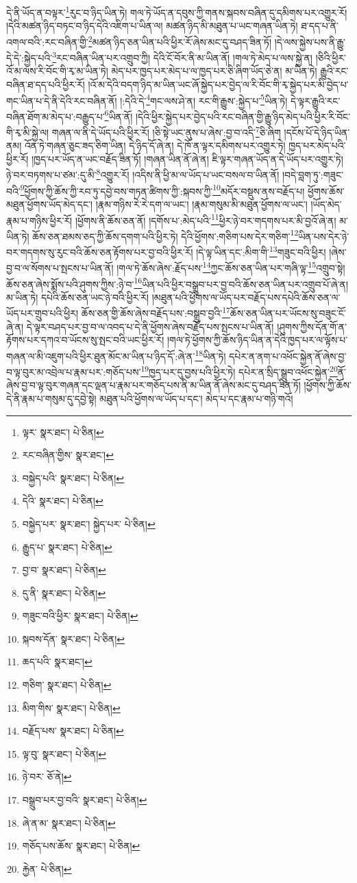 དེ་ནི་ཡོད་ན་བལྟར་\footnote{ལྟར་  སྣར་ཐང་།  པེ་ཅིན། }རུང་བ་ཉིད་ཡིན་ཏེ། གལ་ཏེ་ཡོད་ན་དབུས་ཀྱི་གནས་སྐབས་བཞིན་དུ་དམིགས་པར་འགྱུར་རོ། །དེའི་མཚན་ཉིད་བཏང་བ་ཉིད་དེའི་འཇིག་པ་ཡིན་ལ། མཚན་ཉིད་མི་མཐུན་པ་ཡང་གཞན་ཡིན་ཏེ། ཐ་དད་པ་ནི་འགལ་བའི་:རང་བཞིན་གྱི་\footnote{རང་བཞིན་གྱིས་  སྣར་ཐང་། }མཚན་ཉིད་ཅན་ཡིན་པའི་ཕྱིར་རོ་ཞེས་མང་དུ་བཤད་ཟིན་ཏོ། །དེ་ལས་སྐྱེས་པས་ནི་རྒྱུ་དེ་དེ་:སྐྱེད་པའི་\footnote{བསྐྱེད་པའི་  སྣར་ཐང་།  པེ་ཅིན། }རང་བཞིན་ཡིན་པར་འགྲུབ་ཀྱི། དེའི་ངོ་བོར་ནི་མ་ཡིན་ནོ། །གལ་ཏེ་མེད་པ་ལས་སྐྱེ་ན། །ཅིའི་ཕྱིར་འོ་མ་ལས་རི་བོང་གི་རྭ་མ་ཡིན་ཏེ། མེད་པར་ཁྱད་པར་མེད་པ་ལ་ཁྱད་པར་ཅི་ཞིག་ཡོད་ཅེ་ན། མ་ཡིན་ཏེ། རྒྱུའི་རང་བཞིན་ཐ་དད་པའི་ཕྱིར་རོ། །འོ་མ་དེའི་བདག་ཉིད་མ་ཡིན་ཡང་ཞོ་སྐྱེད་པར་བྱེད་ལ་རི་བོང་གི་རྭ་སྐྱེད་པར་མི་བྱེད་པ་གང་ཡིན་པ་དེ་ནི་དེའི་རང་བཞིན་ནོ། །:དེའི་དེ་\footnote{དེའི་  སྣར་ཐང་།  པེ་ཅིན། }གང་ལས་ཤེ་ན། རང་གི་རྒྱུས་:སྐྱེད་པ་\footnote{བསྐྱེད་པར་  སྣར་ཐང་། སྐྱེད་པར་  པེ་ཅིན། }ཡིན་ཏེ། དེ་ལྟར་རྒྱུའི་རང་བཞིན་ཐོག་མ་མེད་པ་:བརྒྱུད་པ་\footnote{རྒྱུད་པ་  སྣར་ཐང་།  པེ་ཅིན། }ཡིན་ནོ། །དེའི་ཕྱིར་སྐྱེད་པར་བྱེད་པའི་རང་བཞིན་གྱི་རྒྱུ་ཉིད་མེད་པའི་ཕྱིར་རི་བོང་གི་རྭ་མི་སྐྱེ་ལ། གཞན་ལ་ནི་དེ་ཡོད་པའི་ཕྱིར་རོ། །ཅི་སྟེ་ཡང་ནུས་པ་ཞེས་:བྱ་བ་འདི་\footnote{བྱ་བ་  སྣར་ཐང་།  པེ་ཅིན། }ཅི་ཞིག །དངོས་པོ་དེ་ཉིད་ཡིན་ནམ། འོན་ཏེ་གཞན་ཅུང་ཟད་ཅིག་ཡིན། དེ་ཉིད་དོ་ཞེ་ན། དེ་ཁོ་ན་ལྟར་དམིགས་པར་འགྱུར་ཏེ། ཁྱད་པར་མེད་པའི་ཕྱིར་རོ། །ཁྱད་པར་ཡོད་ན་ཡང་བརྗོད་ཟིན་ཏོ། །གཞན་ཡིན་ནོ་ཞེ་ན། ཇི་ལྟར་གཞན་ཡོད་ན་དེ་ཡོད་པར་འགྱུར་ཏེ། ཉེ་བར་བཏགས་པ་ཙམ་:དུ་མི་\footnote{དུ་ནི་  སྣར་ཐང་།  པེ་ཅིན། }འགྱུར་རོ། །འདིས་ནི་ཕྱི་མ་ལ་ཡོད་པ་ཡང་བསལ་བ་ཡིན་ནོ། །བདེ་བླག་ཏུ་:གཟུང་བའི་\footnote{གཟུང་བའི་ཕྱིར་  སྣར་ཐང་།  པེ་ཅིན། }ཕྱོགས་ཀྱི་ཆོས་ཀྱི་རབ་ཏུ་དབྱེ་བས་གཏན་ཚིགས་ཀྱི་:སྐབས་ཀྱི་\footnote{སྐབས་དོན་  སྣར་ཐང་།  པེ་ཅིན། }མདོར་བསྡུས་ནས་བརྗོད་པ། ཕྱོགས་ཆོས་མཐུན་ཕྱོགས་ཡོད་མེད་དང་། །རྣམ་གཉིས་རེ་རེ་དག་ལ་ཡང་། །རྣམ་གསུམ་མི་མཐུན་ཕྱོགས་ལ་ཡང་། །ཡོད་མེད་རྣམ་པ་གཉིས་ཕྱིར་རོ། །ཕྱོགས་ནི་ཆོས་ཅན་ནོ། །དགོས་པ་:མེད་པའི་\footnote{ཆད་པའི་  སྣར་ཐང་། }ཕྱིར་ཉེ་བར་གདགས་པར་མི་བྱའོ་ཞེ་ན། མ་ཡིན་ཏེ། ཆོས་ཅན་ཐམས་ཅད་ཀྱི་ཆོས་དགག་པའི་ཕྱིར་ཏེ། དེའི་ཕྱོགས་:གཅིག་པས་དེར་གཅིག་\footnote{གཅིག་  སྣར་ཐང་།  པེ་ཅིན། }ཡིན་པས་དེར་ཉེ་བར་གདགས་སུ་རུང་བའི་ཆོས་ཅན་རྟོགས་པར་བྱ་བའི་ཕྱིར་རོ། །དེ་ལྟ་ཡིན་དང་:མིག་གི་\footnote{མིག་གིས་  སྣར་ཐང་།  པེ་ཅིན། }གཟུང་བའི་ཕྱིར། །ཞེས་བྱ་བ་ལ་སོགས་པ་སྤངས་པ་ཡིན་ནོ། །གལ་ཏེ་ཆོས་ཞེས་:རྗོད་པས་\footnote{བརྗོད་པས་  སྣར་ཐང་།  པེ་ཅིན། }ཀྱང་ཆོས་ཅན་ཡིན་པར་གཞི་ལྟ་\footnote{ལྟ་བུ་  སྣར་ཐང་།  པེ་ཅིན། }འགྲུབ་སྟེ། ཆོས་ཅན་ཞེས་སྨོས་པའི་ཤུགས་ཀྱིས་:ཉེ་བ་\footnote{ཉེ་བར་  ཅོ་ནེ། }ཡིན་པའི་ཕྱིར་བསྒྲུབ་པར་བྱ་བའི་ཆོས་ཅན་ཡིན་པར་འགྲུབ་པོ་ཞེ་ན། མ་ཡིན་ཏེ། དཔེའི་ཆོས་ཅན་ཡང་ཉེ་བའི་ཕྱིར་རོ། །མཐུན་པའི་ཕྱོགས་ལ་ཡོད་པར་བརྗོད་པས་དཔེའི་ཆོས་ཅན་ལ་ཡོད་པར་གྲུབ་པའི་ཕྱིར། ཆོས་ཅན་གྱི་ཆོས་ཞེས་བརྗོད་པས་:བསྒྲུབ་བྱའི་\footnote{བསྒྲུབ་པར་བྱ་བའི་  སྣར་ཐང་།  པེ་ཅིན། }ཆོས་ཅན་ཡིན་པར་ཡོངས་སུ་བཟུང་ངོ་ཞེ་ན། དེ་ལྟར་བཤད་པར་བྱ་བ་ལ་འབད་པ་དེ་ནི་ཕྱོགས་ཞེས་བརྗོད་པས་སྤངས་པ་ཡིན་ནོ། །ཤུགས་ཀྱིས་དོན་གོ་ན་རྟོགས་པར་དཀའ་བ་ཡོངས་སུ་སྤང་བའི་ཡང་ཕྱིར་རོ། །གལ་ཏེ་ཕྱོགས་ཀྱི་ཆོས་ཉིད་ཡིན་ན་དེའི་ཁྱད་པར་ལ་ལྟོས་པ་གཞན་ལ་མི་འཇུག་པའི་ཕྱིར་ཐུན་མོང་མ་ཡིན་པ་ཉིད་དོ་:ཞེ་ན་\footnote{ཞེ་ན་མ་  སྣར་ཐང་།  པེ་ཅིན། }ཡིན་ཏེ། དཔེར་ན་ནག་པ་འཕོང་སྐྱེན་ནོ་ཞེས་བྱ་བ་ལྟ་བུར་མ་འབྲེལ་པ་རྣམ་པར་:གཅོད་པས་\footnote{གཅོད་པས་ཆོས་  སྣར་ཐང་།  པེ་ཅིན། }ཁྱད་པར་དུ་བྱས་པའི་ཕྱིར་ཏེ། དཔེར་ན་སྲིད་སྒྲུབ་འཕོང་སྐྱེན་\footnote{རྐྱེན་  པེ་ཅིན། }ནོ་ཞེས་བྱ་བ་ལྟ་བུར་གཞན་དང་ལྡན་པ་རྣམ་པར་གཅོད་པས་ནི་མ་ཡིན་ནོ་ཞེས་མང་དུ་བཤད་ཟིན་ཏོ། །ཕྱོགས་ཀྱི་ཆོས་དེ་ནི་རྣམ་པ་གསུམ་དུ་དབྱེ་སྟེ། མཐུན་པའི་ཕྱོགས་ལ་ཡོད་པ་དང་། མེད་པ་དང་རྣམ་པ་གཉི་གའོ། 